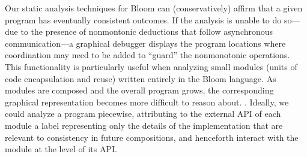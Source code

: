 
Our static analysis techniques for Bloom can
(conservatively) affirm that a given program has eventually consistent outcomes.
If the analysis is unable to do so---due to the presence of nonmontonic deductions
that follow asynchronous communication---a graphical debugger displays the
program locations where coordination may need to be added to ``guard'' the
nonmonotonic operations.    This functionality is particularly useful when
analyzing small modules (units of code encapsulation and reuse) written 
entirely in the Bloom language.
As modules are composed and the overall program grows, the corresponding graphical representation becomes more difficult to reason about.  .  Ideally,
we could analyze a program piecewise, attributing to the external API of each module a
label representing only the details of the implementation that are relevant to
consistency in future compositions, and henceforth interact with the module at
the level of its API.  


